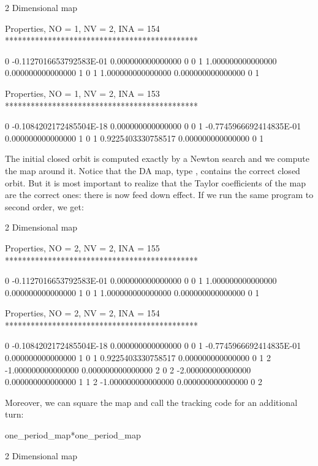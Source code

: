 \documentclass[english,12pt,article]{article} %
\begin{document}
{{{\begin{example}
           2  Dimensional map

 Properties, NO =    1, NV =    2, INA =  154
 *********************************************

   0 -0.1127016653792583E-01   0.000000000000000       0  0
   1   1.000000000000000       0.000000000000000       1  0
   1   1.000000000000000       0.000000000000000       0  1


 Properties, NO =    1, NV =    2, INA =  153
 *********************************************

   0 -0.1084202172485504E-18   0.000000000000000       0  0
   1 -0.7745966692414835E-01   0.000000000000000       1  0
   1  0.9225403330758517       0.000000000000000       0  1
\end{example}

The initial closed orbit is computed exactly by a Newton search and we compute the map around it. Notice that the DA map, type , contains  the correct closed orbit. But it is most important to realize that the Taylor coefficients of the map are the correct ones: there is now feed down effect. If we run the same program to second order, we get:

\begin{example}
           2  Dimensional map

 Properties, NO =    2, NV =    2, INA =  155
 *********************************************

   0 -0.1127016653792583E-01   0.000000000000000       0  0
   1   1.000000000000000       0.000000000000000       1  0
   1   1.000000000000000       0.000000000000000       0  1


 Properties, NO =    2, NV =    2, INA =  154
 *********************************************

   0 -0.1084202172485504E-18   0.000000000000000       0  0
   1 -0.7745966692414835E-01   0.000000000000000       1  0
   1  0.9225403330758517       0.000000000000000       0  1
   2  -1.000000000000000       0.000000000000000       2  0
   2  -2.000000000000000       0.000000000000000       1  1
   2  -1.000000000000000       0.000000000000000       0  2
\end{example}

Moreover, we can square the map and call the tracking code for an additional turn:

\begin{example2}
  one_period_map*one_period_map

           2  Dimensional map


\end{example2}}}}
\end{document}
